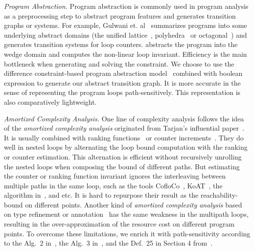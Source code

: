 \emph{Program Abstraction.}
Program abstraction is commonly used in program analysis as a preprocessing step to abstract program features and generates transition graphs or systems. For example, Gulwani et. al~\cite{GulwaniZ10} summarizes programs into some underlying abstract domains (the unified lattice~\cite{CousotH78}, polyhedra~\cite{CousotC77} or octagonal~\cite{Mine06})
and generates transition systems for loop counters.
\cite{KincaidCBR18} abstracts the program into the wedge domain and computes the non-linear loop invariant.
Efficiency is the main bottleneck when generating and solving the constraint.
We choose to use the difference constraint-based program abstraction model~\cite{SinnZV17,SinnZV14} combined with boolean expression to generate our abstract transition graph.
It is more accurate in the sense of representing the program loops path-sensitively. This representation is also comparatively lightweight.

\emph{Amortized Complexity Analysis.}
One line of complexity analysis follows the idea of the \emph{amortized complexity analysis}
originated from Tarjan's influential paper~\cite{PotechinP17}. It is usually combined with ranking functions~\cite{BradleyMS05,CookSZ13,Zuleger18} or counter increments~\cite{ZulegerGSV11,SinnZV14,SinnZV17,LuCT21,AliasDFG10}.
They do well in nested loops by alternating the loop bound computation with the ranking or counter estimation. This alternation is efficient without recursively unrolling the nested loops when composing the bound of different paths.
 But estimating the counter or ranking function invariant ignores the interleaving between multiple paths in the same loop,
such as the tools CofloCo~\cite{Montoya17,Flores-MontoyaH14,Flores-Montoya16}, KoAT~\cite{BrockschmidtEFFG16,BrockschmidtEFFG14,FalkeKS12,FalkeKS11}, the algorithm in~\cite{LuCT21}, and etc.
It is hard to repurpose their result as the reachability-bound on different points.
Another kind of \emph{amortized complexity analysis} based on type refinement or annotation~\cite{CraryW00,JostHLH10,CicekBG0H17,RajaniG0021,CarbonneauxHS15} has the same weakness in the multipath loops, resulting in the over-approximation of the resource cost on different program points.
To overcome these limitations, we enrich it with path-sensitivity according to the Alg.~2 in~\cite{SinnZV14},
the Alg.~3 in~\cite{ZulegerGSV11},
and the Def.~25 in Section 4 from~\cite{SinnZV17}.

